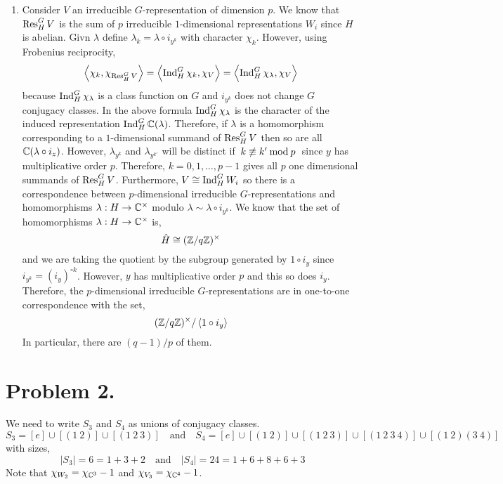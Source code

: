 \documentclass[12pt]{extarticle}
\begin{document}
\begin{enumerate}
\item Consider $V$ an irreducible $G$-representation of dimension $p$. We know that $\mathrm{Res}^{G}_{H} \, V$ is the sum of $p$ irreducible $1$-dimensional representations $W_i$ since $H$ is abelian. Givn $\lambda$ define $\lambda_k = \lambda \circ i_{y^k}$ with character $\chi_k$. However, using Frobenius reciprocity,
\[ \left< \chi_{k}, \chi_{\mathrm{Res}^{G}_{H} \, V} \right> = \left< \mathrm{Ind}^{G}_{H} \, \chi_k, \chi_V \right> = \left< \mathrm{Ind}^{G}_{H} \, \chi_\lambda, \chi_V \right> \]
because $\mathrm{Ind}^{G}_{H} \, \chi_{\lambda}$ is a class function on $G$ and $i_{y^k}$ does not change $G$ conjugacy classes. 
In the above formula $\mathrm{Ind}^{G}_{H} \, \chi_\lambda$ is the character of the induced representation $\mathrm{Ind}^{G}_{H} \, \mathbb{C}(\lambda)$. Therefore, if $\lambda$ is a homomorphism corresponding to a $1$-dimensional summand of $\mathrm{Res}^{G}_{H} \, V$ then so are all $\mathbb{C}(\lambda \circ i_z)$. However, $\lambda_{y^k}$ and $\lambda_{y^{k'}}$ will be distinct if $\nmod{k}{k'}{p}$ since $y$ has multiplicative order $p$. Therefore, $k = 0, 1, \dots, p - 1$ gives all $p$ one dimensional summands of $\mathrm{Res}^{G}_{H} \, V$. Furthermore, $V \cong \mathrm{Ind}^{G}_{H} \, W_i$ so there is a correspondence between $p$-dimensional irreducible $G$-representations and homomorphisms $\lambda : H \to \mathbb{C}^\times$ modulo $\lambda \sim \lambda \circ i_{y^k}$. We know that the set of homomorphisms $\lambda : H \to \mathbb{C}^\times$ is,
\[ \hat{H} \cong (\mathbb{Z} / q \mathbb{Z} )^\times \] 
and we are taking the quotient by the subgroup generated by $1 \circ i_{y}$ since $i_{y^k} = (i_y)^{\circ k}$. However, $y$ has multiplicative order $p$ and this so does $i_y$. Therefore, the $p$-dimensional irreducible $G$-representations are in one-to-one correspondence with the set,
\[ (\mathbb{Z} / q \mathbb{Z})^\times / \left< 1 \circ i_{y} \right> \]
In particular, there are $(q - 1)/p$ of them.  
\end{enumerate}

\section*{Problem 2.}

We need to write $S_3$ and $S_4$ as unions of conjugacy classes.
\[ S_3 = [e] \cup [ (1 \: 2) ] \cup [(1 \: 2 \: 3)] \quad \text{and} \quad S_4 = [e] \cup [(1 \: 2)] \cup [ (1 \: 2 \: 3) ] \cup [(1 \: 2 \: 3 \: 4)] \cup [(1 \: 2) (3 \: 4)] \]
with sizes,
\[ |S_3| = 6 = 1 + 3 + 2 \quad \text{and} \quad |S_4| = 24 = 1 + 6 + 8 + 6 + 3 \]
Note that $\chi_{W_2} = \chi_{\mathbb{C}^3} - 1$ and $\chi_{V_3} = \chi_{\mathbb{C}^4} - 1$. 
\end{document}
